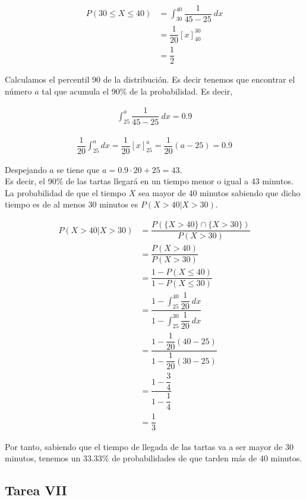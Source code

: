 \documentclass[12pt,a4paper,twoside,openright,titlepage,final]{article}
\begin{document}
\begin{align*}
P(30 \leq X \leq 40) & = \int_{30}^{40} \dfrac{1}{45 -25} \ dx \\
& = \dfrac{1}{20}\left[x\right]_{40}^{30} \\ & = \dfrac{1}{2}
\end{align*}

Calculamos el percentil 90 de la distribución. Es decir tenemos que encontrar el número $a$ tal que acumula el 90\% de la probabilidad. Es decir,

\begin{align*}
\int_{25}^{a} \dfrac{1}{45 - 25} \ dx = 0.9
\end{align*}

\begin{align*}
\dfrac{1}{20}\int_{25}^{a} dx = \dfrac{1}{20} \left[x\right]_{25}^{a} = \dfrac{1}{20}(a - 25) = 0.9
\end{align*}

Despejando $a$ se tiene que $a = 0.9 \cdot 20 + 25 = 43$.\\

Es decir, el 90\% de las tartas llegará en un tiempo menor o igual a 43 minutos.\\

La probabilidad de que el tiempo $X$ sea mayor de 40 minutos sabiendo que dicho tiempo es de al menos 30 minutos es $P(X > 40 | X > 30)$.

\begin{align*}
\displaystyle P(X > 40 | X > 30) & = \dfrac{P(\{X > 40\}\cap \{X > 30\})}{P(X > 30)} \\
& = \dfrac{P(X > 40)}{P(X > 30)} \\ & = \dfrac{1 - P(X \leq 40)}{1 - P(X \leq 30)} \\
& = \dfrac{1 - \displaystyle \int_{25}^{40} \dfrac{1}{20} \ dx}{1 - \displaystyle \int_{25}^{30} \dfrac{1}{20} \ dx} \\
& = \dfrac{1 - \dfrac{1}{20}(40-25)}{1 - \dfrac{1}{20}(30-25)} \\
& = \dfrac{1- \dfrac{3}{4}}{1 - \dfrac{1}{4}} \\
& = \dfrac{1}{3}
\end{align*}

Por tanto, sabiendo que el tiempo de llegada de las tartas va a ser mayor de 30 minutos, tenemos un 33.33\% de probabilidades de que tarden más de 40 minutos.

\subsection{Tarea VII}
\end{document}
